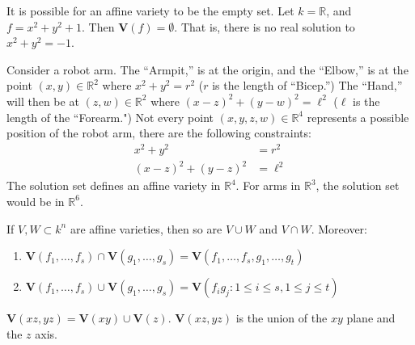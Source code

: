 \documentclass[crop=false,class=article,oneside]{standalone}
\begin{document}
            \begin{remark}
                It is possible for an affine variety to be
                the empty set. Let $k=\mathbb{R}$,
                and $f=x^{2}+y^{2}+1$. Then
                $\mathbf{V}(f)=\emptyset$. That is, there
                is no real solution to
                $x^{2}+y^{2}=-1$.
            \end{remark}
            \begin{example}
                Consider a robot arm. The ``Armpit,'' is at the origin,
                and the ``Elbow,'' is at the point $(x,y)\in \mathbb{R}^2$
                where $x^{2}+y^{2}=r^{2}$
                ($r$ is the length of ``Bicep.'')
                The ``Hand,'' will then be at
                $(z,w)\in\mathbb{R}^{2}$ where
                $(x-z)^{2}+(y-w)^{2}=\ell^{2}$
                ($\ell$ is the length of the ``Forearm.")
                Not every point $(x,y,z,w)\in\mathbb{R}^{4}$
                represents a possible position of the
                robot arm, there are the following constraints:
                \begin{align*}
                    x^{2}+y^{2}&=r^{2}\\ 
                    (x-z)^{2}+(y-z)^{2}&=\ell^{2}
                \end{align*}
                The solution set defines an affine variety
                in $\mathbb{R}^4$. For arms in $\mathbb{R}^3$,
                the solution set would be in $\mathbb{R}^6$.
            \end{example}
            \begin{theorem}
                If $V,W\subset k^n$ are affine varieties,
                then so are $V\cup W$ and $V\cap W$. Moreover:
                \begin{enumerate}
                    \item $\mathbf{V}(f_{1},\hdots,f_{s})%
                           \cap\mathbf{V}(g_{1},\hdots,g_{s})%
                           =\mathbf{V}(f_{1},%
                           \hdots,f_{s},g_{1},%
                           \hdots,g_{t})$
                    \item $\mathbf{V}(f_{1},\hdots,f_{s})%
                           \cup\mathbf{V}(g_{1},\hdots,g_{s})%
                           =\mathbf{V}(%
                           f_{i}g_{j}:1\leq i\leq s,1\leq j\leq t)$
                \end{enumerate}
            \end{theorem}
            \begin{example}
                $\mathbf{V}(xz,yz)%
                 =\mathbf{V}(xy)\cup\mathbf{V}(z)$.
                $\mathbf{V}(xz,yz)$ is the union
                of the $xy$ plane
                and the $z$ axis.
            \end{example}
\end{document}
